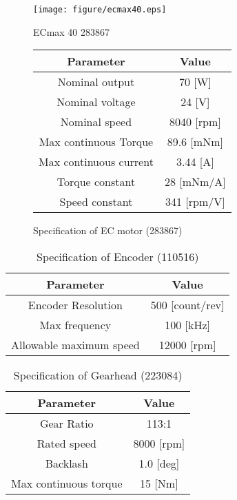 \documentclass[a4paper,12pt]{article_vdlab_sotsuron}
\begin{document}
\vspace*{5mm}
\begin{figure}[h]
  \begin{minipage}{0.4\textwidth}
    \centering
      \texttt{[image: figure/ecmax40.eps]}
      \vspace*{3mm}
      \caption{ECmax 40 283867}
      \label{fig:EC_motor}
  \end{minipage}
  \begin{minipage}{0.5\textwidth}
      \centering
	\makeatletter
	\def\@captype{table}
	\makeatother
	\caption{Specification of EC motor (283867)}
	\label{tab:EC_motor}
	  \begin{tabular}{cc}\hline
	    Parameter & Value \\\hline
	    Nominal output & 70 [W] \\
	    Nominal voltage & 24 [V] \\
	    Nominal speed & 8040 [rpm] \\
	    Max continuous Torque & 89.6 [mNm] \\
	    Max continuous current & 3.44 [A] \\
	    Torque constant & 28 [mNm/A] \\
	    Speed constant & 341 [rpm/V] \\\hline
	  \end{tabular}
  \end{minipage}
\end{figure}
\vspace*{10mm}
\begin{table}[h]
  \begin{center}
    \caption{Specification of Encoder (110516)}
    \label{tab:Encoder}
      \begin{tabular}{cc}\hline
      Parameter & Value \\\hline
      Encoder Resolution & 500 [count/rev] \\
      Max frequency & 100 [kHz] \\
      Allowable maximum speed & 12000 [rpm] \\\hline
    \end{tabular}
  \end{center}
\end{table}\vspace*{10mm}
\begin{table}[h]
  \begin{center}
    \caption{Specification of Gearhead (223084)}
    \label{tab:Gearhead}
    \begin{tabular}{cc}\hline
      Parameter & Value \\\hline
      Gear Ratio & 113:1 \\
      Rated speed & 8000 [rpm] \\
      Backlash & 1.0 [deg] \\
      Max continuous torque & 15 [Nm] \\\hline
    \end{tabular}
  \end{center}
\end{table}
\end{document}
